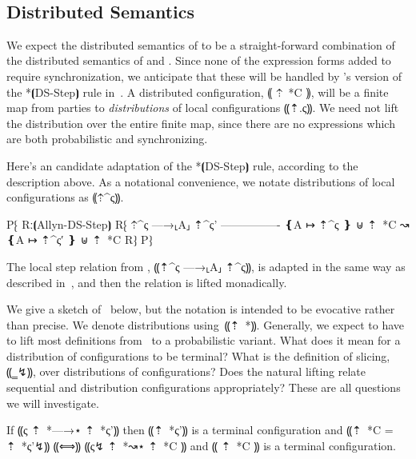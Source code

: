  \\

\subsection{Distributed Semantics}
\label{subsec:proposal-design-dist}

We expect the distributed semantics of \lang to be a straight-forward combination of the
distributed semantics of \mpc and \obliv. Since none of the expression forms added to
\lang require synchronization, we anticipate that these will be handled by \lang's version
of the *⦗DS-Step⦘ rule in~. A \lang distributed configuration, ⸨ ⇡~*C ⸩,
will be a finite map from parties to \emph{distributions} of local configurations ⸨⇡.ς⸩.
We need not lift the distribution over the entire finite map, since there are no expressions
which are both probabilistic and synchronizing.

Here's an candidate adaptation of the *⦗DS-Step⦘ rule, according to the description above. As
a notational convenience, we notate distributions of local configurations as ⸨⇡^ς⸩.

P⁅ Rː⦗Allyn-DS-Step⦘
   R⁅ ⇡^ς —→⸤A⸥ ⇡^{ς'}
      ----------------
      ❴A ↦ ⇡^ς ❵ ⊎ ⇡~*C ↝ ❴A ↦ ⇡^{ς′} ❵ ⊎ ⇡~*C
   R⁆
P⁆

The local step relation from \mpc, ⸨⇡^ς —→⸤A⸥ ⇡^ς⸩, is adapted in the same way as described
in~, and then the relation is lifted monadically.

We give a sketch of~ below, but the notation is intended to be evocative rather
than precise. We denote distributions using~⸨⇡~*{}⸩. Generally, we expect to have to lift most definitions from~
to a probabilistic variant. What does it mean for a distribution of configurations to be terminal? What is the definition of slicing, ⸨‗↯⸩,
over distributions of configurations? Does the natural lifting relate sequential and distribution configurations appropriately? These
are all questions we will investigate.

\begin{theorem}\label{thm:lang-simulation}
    If ⸨ς ⇡~*{—→}⋆ ⇡~*{ς'}⸩ then ⸨⇡~*{ς'}⸩ is a terminal configuration and ⸨⇡~*C = ⇡~*{ς'}↯⸩ ⸨⟺⸩ ⸨ς↯ ⇡~*{↝}⋆ ⇡~*C ⸩ and ⸨ ⇡~*C ⸩ is a terminal configuration.
\end{theorem}

